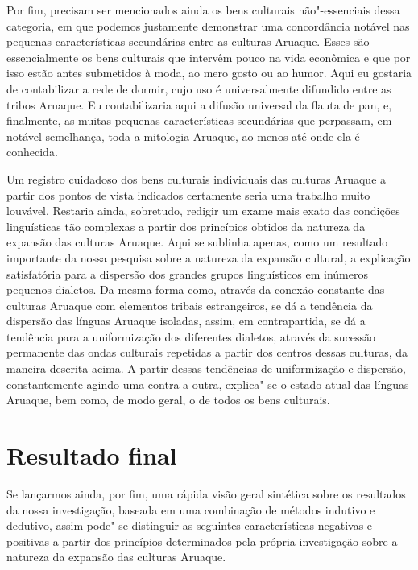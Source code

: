Por fim, precisam ser mencionados ainda os bens culturais não"-essenciais
dessa categoria, em que podemos justamente demonstrar uma concordância
notável nas pequenas características secundárias entre as culturas
Aruaque. Esses são essencialmente os bens culturais que intervêm pouco
na vida econômica e que por isso estão antes submetidos à moda, ao mero
gosto ou ao humor. Aqui eu gostaria de contabilizar a rede de dormir,
cujo uso é universalmente difundido entre as tribos Aruaque. Eu
contabilizaria aqui a difusão universal da flauta de pan, e, finalmente,
as muitas pequenas características secundárias que perpassam, em notável
semelhança, toda a mitologia Aruaque, ao menos até onde ela é conhecida.

Um registro cuidadoso dos bens culturais individuais das culturas
Aruaque a partir dos pontos de vista indicados certamente seria uma
trabalho muito louvável. Restaria ainda, sobretudo, redigir um exame
mais exato das condições linguísticas tão complexas a partir dos
princípios obtidos da natureza da expansão das culturas Aruaque. Aqui se
sublinha apenas, como um resultado importante da nossa pesquisa sobre a
natureza da expansão cultural, a explicação satisfatória para a
dispersão dos grandes grupos linguísticos em inúmeros pequenos dialetos.
Da mesma forma como, através da conexão constante das culturas Aruaque
com elementos tribais estrangeiros, se dá a tendência da dispersão das
línguas Aruaque isoladas, assim, em contrapartida, se dá a tendência
para a uniformização dos diferentes dialetos, através da sucessão
permanente das ondas culturais repetidas a partir dos centros dessas
culturas, da maneira descrita acima. A partir dessas tendências de
uniformização e dispersão, constantemente agindo uma contra a outra,
explica"-se o estado atual das línguas Aruaque, bem como, de modo geral,
o de todos os bens culturais.

\chapter{Resultado final}

Se lançarmos ainda, por fim, uma rápida visão geral sintética sobre os
resultados da nossa investigação, baseada em uma combinação de métodos
indutivo e dedutivo, assim pode"-se distinguir as seguintes
características negativas e positivas a partir dos princípios
determinados pela própria investigação sobre a natureza da expansão das
culturas Aruaque.

